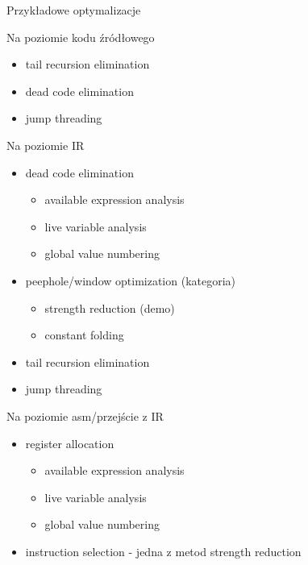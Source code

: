\begin{frame}{Przykładowe optymalizacje}
\begin{block}{Na poziomie kodu źródłowego}
\begin{itemize}
			\item tail recursion elimination
			\item dead code elimination
			\item jump threading
		\end{itemize}
	\end{block}
	\begin{block}{Na poziomie IR}
		\begin{itemize}
			\item dead code elimination
				\begin{itemize}
					\item available expression analysis
					\item live variable analysis
					\item global value numbering
				\end{itemize}
			\item peephole/window optimization (kategoria)
				\begin{itemize}
					\item strength reduction (demo)
					\item constant folding
				\end{itemize}
			\item tail recursion elimination
			\item jump threading
		\end{itemize}
	\end{block}
	\begin{block}{Na poziomie asm/przejście z IR}
		\begin{itemize}
			\item register allocation
				\begin{itemize}
					\item available expression analysis
					\item live variable analysis
					\item global value numbering
				\end{itemize}
			\item instruction selection - jedna z metod strength reduction
				\begin{itemize}

\end{itemize}
\end{itemize}
\end{block}
\end{frame}
